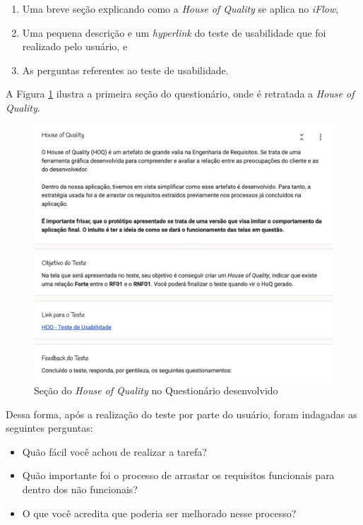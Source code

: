 \begin{enumerate}
    \item Uma breve seção explicando como a \textit{House of Quality} se aplica no \textit{iFlow},
    \item Uma pequena descrição e um \textit{hyperlink} do teste de usabilidade que foi realizado pelo usuário, e
    \item As perguntas referentes ao teste de usabilidade.
\end{enumerate}

A Figura \ref{fig:hq_secao} ilustra a primeira seção do questionário, onde é retratada a \textit{House of Quality}.

\begin{figure}[H]
    \begin{center}
        \caption{{Seção do \textit{House of Quality} no Questionário desenvolvido}}
        \label{fig:hq_secao}
        \includegraphics[scale=0.5]{figuras/questionario/house-of-quality-section-1.png}
    \end{center}
\end{figure}

Dessa forma, após a realização do teste por parte do usuário, foram indagadas as seguintes perguntas:

\begin{itemize}
    \item Quão fácil você achou de realizar a tarefa?
    \item Quão importante foi o processo de arrastar os requisitos funcionais para dentro dos não funcionais?
    \item O que você acredita que poderia ser melhorado nesse processo?
\end{itemize}


